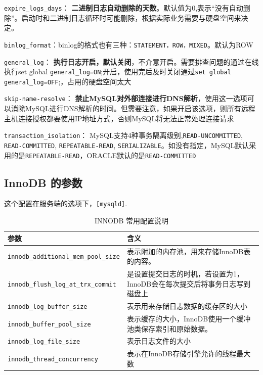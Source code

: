 \documentclass[UTF8,a4paper,12pt]{ctexbook}
\begin{document}
		
		\verb|expire_logs_days|：  \textbf{二进制日志自动删除的天数}。默认值为0,表示“没有自动删除”。启动时和二进制日志循环时可能删除，根据实际业务需要与硬盘空间来决定。
		
		
		\verb|binlog_format|：binlog的格式也有三种：\verb|STATEMENT，ROW，MIXED|。默认为ROW
		
		\verb|general_log|： \textbf{执行日志开启，默认关闭}，不介意开启。需要排查问题的通过在线执行set global \verb|general_log=ON|;开启，使用完后及时关闭通过\verb|set global general_log=OFF|;，占用的硬盘空间太大
		
		\verb|skip-name-resolve|： \textbf{禁止MySQL对外部连接进行DNS解析}，使用这一选项可以消除MySQL进行DNS解析的时间。但需要注意，如果开启该选项，则所有远程主机连接授权都要使用IP地址方式，否则MySQL将无法正常处理连接请求
		
		\verb|transaction_isolation|： MySQL支持4种事务隔离级别,\verb|READ-UNCOMMITTED|, \verb|READ-COMMITTED|, \verb|REPEATABLE-READ|, \verb|SERIALIZABLE|。如没有指定，MySQL默认采用的是\verb|REPEATABLE-READ|，ORACLE默认的是\verb|READ-COMMITTED|
		
		\subsection{InnoDB 的参数}
			这个配置在服务端的选项下，\verb|[mysqld]|.
			
			\begin{table}[H]
				\centering
				\caption{INNODB 常用配置说明}
				\begin{tabular}{p{6cm}<{\centering}|p{12cm}<{\centering}}
					\toprule
						参数 &  含义 \\
					\midrule
						\verb|innodb_additional_mem_pool_size| & 表示附加的内存池，用来存储InnoDB表的内容。 \\
						\verb|innodb_flush_log_at_trx_commit| & 是设置提交日志的时机，若设置为1，InnoDB会在每次提交后将事务日志写到磁盘上 \\	
						\verb|innodb_log_buffer_size| & 表示用来存储日志数据的缓存区的大小 \\
						\verb|innodb_buffer_pool_size| & 表示缓存的大小，InnoDB使用一个缓冲池类保存索引和原始数据。 \\
						\verb|innodb_log_file_size| & 表示日志文件的大小 \\
						\verb|innodb_thread_concurrency| & 表示在InnoDB存储引擎允许的线程最大数 \\
					\bottomrule
				\end{tabular}
			\end{table}			
			
\end{document}
